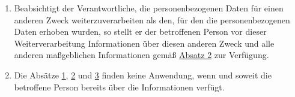 \begin{enumerate}
\begin{enumerate}
  \end{enumerate}

  \item Beabsichtigt der Verantwortliche, die personenbezogenen Daten für einen anderen Zweck weiterzuverarbeiten als
   den, für den die personenbezogenen Daten erhoben wurden, so stellt er der betroffenen Person vor dieser
   Weiterverarbeitung Informationen über diesen anderen Zweck und alle anderen maßgeblichen Informationen gemäß
   \hyperref[itm:13-2]{Absatz 2} zur Verfügung.
  \label{itm:13-3}  

  \item Die Absätze \hyperref[itm:13-1]{1}, \hyperref[itm:13-2]{2} und \hyperref[itm:13-3]{3} finden keine Anwendung,
   wenn und soweit die betroffene Person bereits über die Informationen verfügt.
  \label{itm:13-3}  

\end{enumerate}


